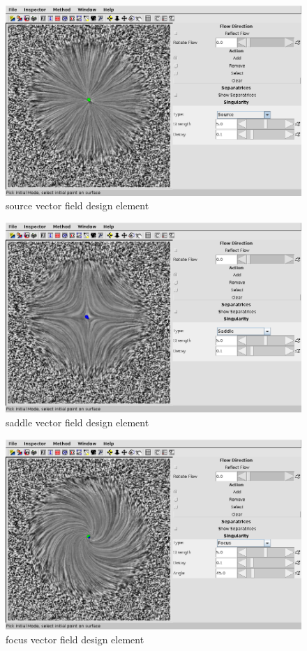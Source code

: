 \documentclass[a4paper,10pt,notitlepage]{scrreprt}
\begin{document}
\begin{figure}
  \centering
  \includegraphics[scale=0.5]{img-3-2/source.png}
  \caption{source vector field design element}
  \label{fig:source}
\end{figure}

\begin{figure}
  \centering
  \includegraphics[scale=0.5]{img-3-2/saddle.png}
  \caption{saddle vector field design element}
  \label{fig:saddle}
\end{figure}

\begin{figure}
  \centering
  \includegraphics[scale=0.5]{img-3-2/focus.png}
  \caption{focus vector field design element}
  \label{fig:focus}
\end{figure}
\end{document}

